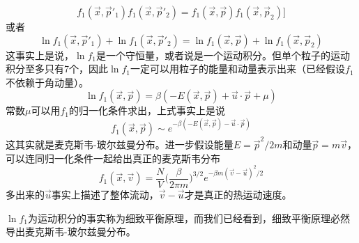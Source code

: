 \documentclass[a4paper,11pt]{ctexart}
\newcommand{\beq}{\begin{equation}}
\newcommand{\eeq}{\end{equation}}
\newcommand{\red}{\color{red}}
\begin{document}
\beq
f_1(\vec{x},\vec{p}'_1)f_1(\vec{x},\vec{p}'_2) =f_1(\vec{x},\vec{p})f_1(\vec{x},\vec{p}_2)]
\eeq
或者
\beq
\ln f_1(\vec{x},\vec{p}'_1) + \ln f_1(\vec{x},\vec{p}'_2) = \ln f_1(\vec{x},\vec{p}) + \ln f_1(\vec{x},\vec{p}_2)
\eeq
这事实上是说，$\ln f_1$是一个守恒量，或者说是一个运动积分。但单个粒子的运动积分至多只有7个，因此$\ln f_1$一定可以用粒子的能量和动量表示出来（已经假设$f_1$不依赖于角动量）。
\beq
\ln f_1(\vec{x},\vec{p}) = \beta (-E(\vec{x},\vec{p}) + \vec{u} \cdot \vec{p} + \mu)
\eeq
常数$\mu$可以用$f_1$的归一化条件求出，上式事实上是说
\beq
f_1(\vec{x},\vec{p}) \sim e^{-\beta (-E(\vec{x},\vec{p}) - \vec{u} \cdot \vec{p})}
\eeq
这其实就是麦克斯韦-玻尔兹曼分布。进一步假设能量$E = \vec{p}^2/2m$和动量$\vec{p} = m\vec{v}$，可以连同归一化条件一起给出真正的麦克斯韦分布
\beq
f_1(\vec{x},\vec{v})  =  \frac{N}{V} \big( \frac{\beta}{2\pi m}\big)^{3/2} e^{-\beta m (\vec{v} - \vec{u})^2/2}
\eeq
多出来的$\vec{u}$事实上描述了整体流动，$\vec{v}-\vec{u}$才是真正的热运动速度。
\par
$\ln f_1$为运动积分的事实称为{\red 细致平衡原理}，而我们已经看到，细致平衡原理必然导出麦克斯韦-玻尔兹曼分布。
\end{document}
